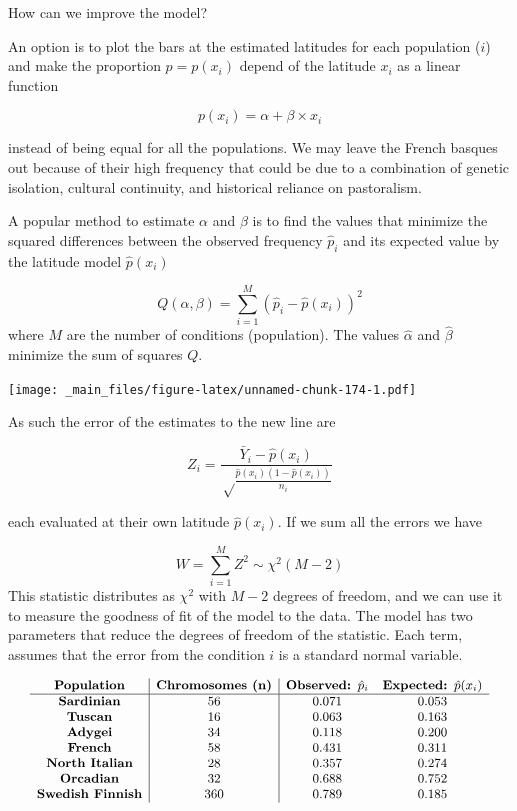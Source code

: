 \documentclass[
]{book}
\begin{document}
How can we improve the model?

An option is to plot the bars at the estimated latitudes for each population (\(i\)) and make the proportion \(p=p(x_i)\) depend of the latitude \(x_i\) as a linear function

\[p(x_i)=\alpha+\beta\times x_i\]

instead of being equal for all the populations. We may leave the French basques out because of their high frequency that could be due to a combination of genetic isolation, cultural continuity, and historical reliance on pastoralism.

A popular method to estimate \(\alpha\) and \(\beta\) is to find the values that minimize the squared differences between the observed frequency \(\hat{p}_i\) and its expected value by the latitude model \(\hat{p}(x_i)\)

\[Q(\alpha, \beta)= \sum_{i=1}^{M} (\hat{p}_i -\hat{p}(x_i))^2\]
where \(M\) are the number of conditions (population). The values \(\hat{\alpha}\) and \(\hat{\beta}\) minimize the sum of squares \(Q\).

\texttt{[image: \_main\_files/figure-latex/unnamed-chunk-174-1.pdf]}

As such the error of the estimates to the new line are

\[Z_i= \frac{\bar{Y}_i-\hat{p}(x_i)}{\sqrt\frac{\hat{p}(x_i)(1-\hat{p}(x_i))}{n_i}}\]

each evaluated at their own latitude \(\hat{p}(x_i)\). If we sum all the errors we have

\[W= \sum_{i=1}^{M} Z^2 \sim\chi^2(M-2)\]
This statistic distributes as \(\chi^2\) with \(M-2\) degrees of freedom, and we can use it to measure the goodness of fit of the model to the data. The model has two parameters that reduce the degrees of freedom of the statistic. Each term, assumes that the error from the condition \(i\) is a standard normal variable.

\[
\small
\begin{array}{c|c|cc}
\textbf{Population} & \textbf{Chromosomes (n)} & \textbf{Observed: } \hat{p}_i & \textbf{Expected: } \hat{p}(x_i) \\
\hline
\textbf{Sardinian} & 56 & 0.071 & 0.053\\
\textbf{Tuscan} & 16 & 0.063 & 0.163\\
\textbf{Adygei} & 34 & 0.118 & 0.200\\
\textbf{French} & 58 & 0.431 & 0.311\\
\textbf{North Italian} & 28 & 0.357 & 0.274 \\
\textbf{Orcadian} & 32 & 0.688 & 0.752\\
\textbf{Swedish Finnish} & 360 & 0.789  & 0.185\\
\end{array}
\]
\end{document}
